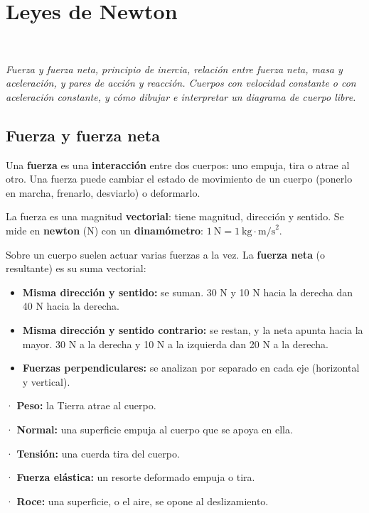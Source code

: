 \section[Leyes de Newton]{Leyes de Newton}
\modcomun\ \ {\color{gris}\itshape Fuerza y fuerza neta, principio de inercia, relación entre fuerza neta, masa y aceleración, y pares de acción y reacción. Cuerpos con velocidad constante o con aceleración constante, y cómo dibujar e interpretar un diagrama de cuerpo libre.\par}
\subsection{Fuerza y fuerza neta}
Una \textbf{fuerza} es una \textbf{interacción} entre dos cuerpos: uno empuja, tira o atrae al otro. Una fuerza puede cambiar el estado de movimiento de un cuerpo (ponerlo en marcha, frenarlo, desviarlo) o deformarlo.

 

La fuerza es una magnitud \textbf{vectorial}: tiene magnitud, dirección y sentido. Se mide en \textbf{newton} (N) con un \textbf{dinamómetro}: $1\ \text{N} = 1\ \text{kg}\cdot\text{m/s}^2$.

 

Sobre un cuerpo suelen actuar varias fuerzas a la vez. La \textbf{fuerza neta} (o resultante) es su suma vectorial:

 
\begin{itemize}
  \item \textbf{Misma dirección y sentido:} se suman. 30 N y 10 N hacia la derecha dan 40 N hacia la derecha.
  \item \textbf{Misma dirección y sentido contrario:} se restan, y la neta apunta hacia la mayor. 30 N a la derecha y 10 N a la izquierda dan 20 N a la derecha.
  \item \textbf{Fuerzas perpendiculares:} se analizan por separado en cada eje (horizontal y vertical).
\end{itemize}
  
\begin{clave} · \textbf{Peso:} la Tierra atrae al cuerpo.\par · \textbf{Normal:} una superficie empuja al cuerpo que se apoya en ella.\par · \textbf{Tensión:} una cuerda tira del cuerpo.\par · \textbf{Fuerza elástica:} un resorte deformado empuja o tira.\par · \textbf{Roce:} una superficie, o el aire, se opone al deslizamiento.\end{clave}
 

